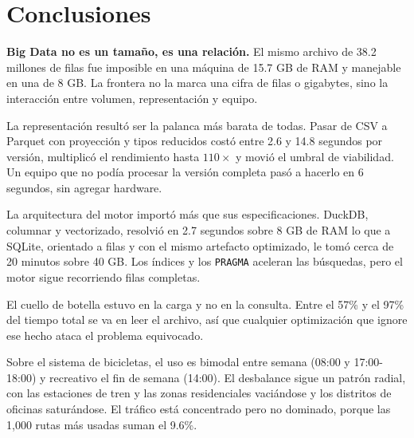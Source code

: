 \section{Conclusiones}

\textbf{Big Data no es un tamaño, es una relación.} El mismo archivo de 38.2 millones de filas fue imposible en una máquina de 15.7 GB de RAM y manejable en una de 8 GB. La frontera no la marca una cifra de filas o gigabytes, sino la interacción entre volumen, representación y equipo.

La representación resultó ser la palanca más barata de todas. Pasar de CSV a Parquet con proyección y tipos reducidos costó entre 2.6 y 14.8 segundos por versión, multiplicó el rendimiento hasta $110\times$ y movió el umbral de viabilidad. Un equipo que no podía procesar la versión completa pasó a hacerlo en 6 segundos, sin agregar hardware.

La arquitectura del motor importó más que sus especificaciones. DuckDB, columnar y vectorizado, resolvió en 2.7 segundos sobre 8 GB de RAM lo que a SQLite, orientado a filas y con el mismo artefacto optimizado, le tomó cerca de 20 minutos sobre 40 GB. Los índices y los \texttt{PRAGMA} aceleran las búsquedas, pero el motor sigue recorriendo filas completas.

El cuello de botella estuvo en la carga y no en la consulta. Entre el 57\% y el 97\% del tiempo total se va en leer el archivo, así que cualquier optimización que ignore ese hecho ataca el problema equivocado.

Sobre el sistema de bicicletas, el uso es bimodal entre semana (08:00 y 17:00-18:00) y recreativo el fin de semana (14:00). El desbalance sigue un patrón radial, con las estaciones de tren y las zonas residenciales vaciándose y los distritos de oficinas saturándose. El tráfico está concentrado pero no dominado, porque las 1,000 rutas más usadas suman el 9.6\%.

